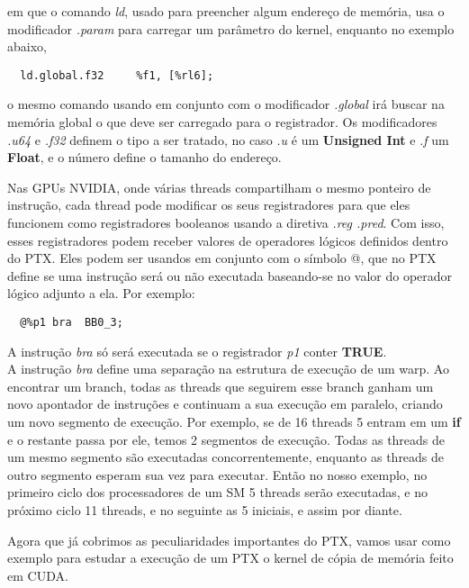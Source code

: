 em que o comando \textit{ld}, usado para preencher algum endereço de memória, usa o modificador \textit{.param} para carregar um parâmetro do kernel,
enquanto no exemplo abaixo,

\begin{lstlisting}
  ld.global.f32 	%f1, [%rl6];
\end{lstlisting}

o mesmo comando usando em conjunto com o modificador \textit{.global} irá buscar na memória global o que deve ser carregado para o registrador.
Os modificadores \textit{.u64} e \textit{.f32} definem o tipo a ser tratado, no caso \textit{.u} é um \textbf{Unsigned Int} e \textit{.f} um
\textbf{Float}, e o número define o tamanho do endereço. 

Nas GPUs NVIDIA, onde várias threads compartilham o mesmo ponteiro de instrução, cada thread pode modificar os seus registradores para que eles 
funcionem como registradores booleanos usando a diretiva \textit{.reg .pred}. Com isso, esses registradores podem receber valores de operadores
lógicos definidos dentro do PTX. Eles podem ser usandos em conjunto com o símbolo @, que no PTX define se uma instrução será ou não executada
baseando-se no valor do operador lógico adjunto a ela.
Por exemplo:

\begin{lstlisting}
  @%p1 bra 	BB0_3;
\end{lstlisting} 

A instrução \textit{bra} só será executada se o registrador \textit{p1} conter \textbf{TRUE}. \\

A instrução \textit{bra} define uma separação na estrutura de execução de um warp. Ao encontrar um branch, todas as threads que seguirem esse branch 
ganham um novo apontador de instruções e continuam a sua execução em paralelo, criando um novo segmento de execução. Por exemplo, se de 16 threads 
5 entram em um \textbf{if} e o restante passa por ele, temos 2 segmentos de execução. Todas as threads de um mesmo segmento são executadas concorrentemente, 
enquanto as threads de outro segmento esperam sua vez para executar. Então no nosso exemplo, no primeiro ciclo dos processadores de um SM 5 threads serão
executadas, e no próximo ciclo 11 threads, e no seguinte as 5 iniciais, e assim por diante.
 
Agora que já cobrimos as peculiaridades importantes do PTX, vamos usar como exemplo para estudar a execução de um PTX o kernel de cópia de memória feito
em CUDA.


